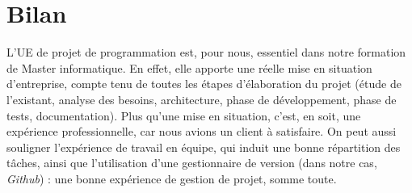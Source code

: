 \chapter{Bilan}


L'UE de projet de programmation est, pour nous, essentiel dans notre formation de Master informatique. En effet, elle apporte une réelle mise en situation d'entreprise, compte tenu de toutes les étapes d'élaboration du projet (étude de l'existant, analyse des besoins, architecture, phase de développement, phase de tests, documentation).
Plus qu'une mise en situation, c'est, en soit, une expérience professionnelle, car nous avions un client à satisfaire.
On peut aussi souligner l'expérience de travail en équipe, qui induit une bonne répartition des tâches, ainsi que l'utilisation d'une gestionnaire de version (dans notre cas, \textit{Github}) : une bonne expérience de gestion de projet, somme toute.
